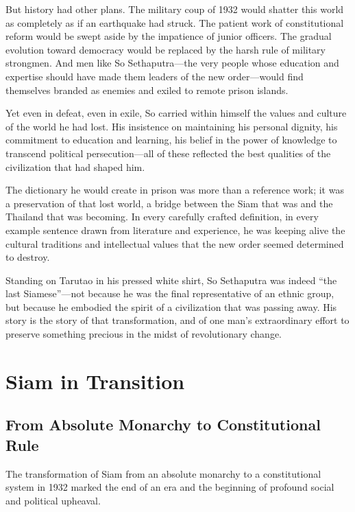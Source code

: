 \documentclass[
  Letterpaper,
]{scrbook}
\begin{document}
But history had other plans. The military coup of 1932 would shatter
this world as completely as if an earthquake had struck. The patient
work of constitutional reform would be swept aside by the impatience of
junior officers. The gradual evolution toward democracy would be
replaced by the harsh rule of military strongmen. And men like So
Sethaputra---the very people whose education and expertise should have
made them leaders of the new order---would find themselves branded as
enemies and exiled to remote prison islands.

Yet even in defeat, even in exile, So carried within himself the values
and culture of the world he had lost. His insistence on maintaining his
personal dignity, his commitment to education and learning, his belief
in the power of knowledge to transcend political persecution---all of
these reflected the best qualities of the civilization that had shaped
him.

The dictionary he would create in prison was more than a reference work;
it was a preservation of that lost world, a bridge between the Siam that
was and the Thailand that was becoming. In every carefully crafted
definition, in every example sentence drawn from literature and
experience, he was keeping alive the cultural traditions and
intellectual values that the new order seemed determined to destroy.

Standing on Tarutao in his pressed white shirt, So Sethaputra was indeed
``the last Siamese''---not because he was the final representative of an
ethnic group, but because he embodied the spirit of a civilization that
was passing away. His story is the story of that transformation, and of
one man's extraordinary effort to preserve something precious in the
midst of revolutionary change.


\chapter{Siam in Transition}\label{sec-siam-transition}

\section{From Absolute Monarchy to Constitutional
Rule}\label{from-absolute-monarchy-to-constitutional-rule}

The transformation of Siam from an absolute monarchy to a constitutional
system in 1932 marked the end of an era and the beginning of profound
social and political upheaval.
\end{document}
